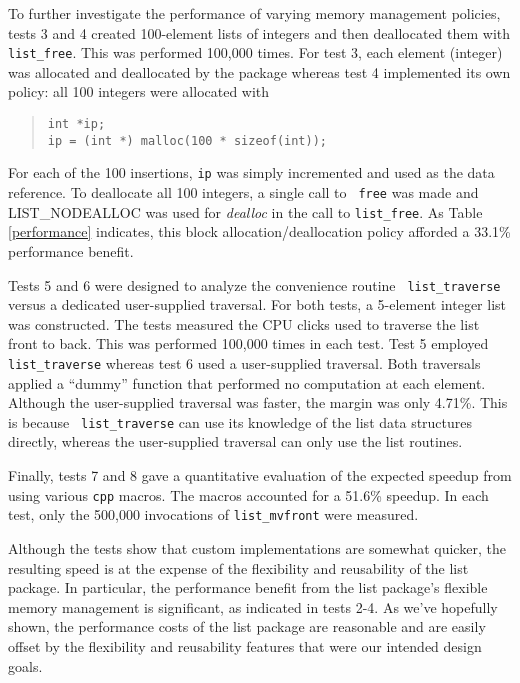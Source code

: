 To further investigate the performance of varying memory management policies,
tests 3 and 4 created 100-element lists of integers and then deallocated them
with {\tt list\_free}.  This was performed 100,000 times.  For test 3, each
element (integer) was allocated and deallocated by the package whereas test 4
implemented its own policy: all 100 integers were allocated with
\begin{quote}
\begin{verbatim}
int *ip;
ip = (int *) malloc(100 * sizeof(int));
\end{verbatim}
\end{quote}
For each of the 100 insertions, {\tt ip} was simply incremented and used as
the data reference.  To deallocate all 100 integers, a single call to {\tt
free} was made and LIST\_NODEALLOC was used for {\em dealloc} in the call to
{\tt list\_free}.  As Table
\ref{performance} indicates, this block allocation/deallocation policy
afforded a 33.1\% performance benefit.

Tests 5 and 6 were designed to analyze the convenience routine {\tt
list\_traverse} versus a dedicated user-supplied traversal.  For both tests, a
5-element integer list was constructed.  The tests measured the CPU clicks
used to traverse the list front to back.  This was performed 100,000 times in
each test.  Test 5 employed {\tt list\_traverse} whereas test 6 used a
user-supplied traversal.  Both traversals applied a ``dummy'' function that
performed no computation at each element.  Although the user-supplied
traversal was faster, the margin was only 4.71\%.  This is because {\tt
list\_traverse} can use its knowledge of the list data structures directly,
whereas the user-supplied traversal can only use the list routines.

Finally, tests 7 and 8 gave a quantitative evaluation of the expected speedup
from using various {\tt cpp} macros.  The macros accounted for a 51.6\%
speedup.  In each test, only the 500,000 invocations of {\tt list\_mvfront}
were measured.

Although the tests show that custom implementations are somewhat quicker, the
resulting speed is at the expense of the flexibility and reusability of the
list package.  In particular, the performance benefit from the list package's
flexible memory management is significant, as indicated in tests 2-4.  As
we've hopefully shown, the performance costs of the list package are
reasonable and are easily offset by the flexibility and reusability features
that were our intended design goals.


